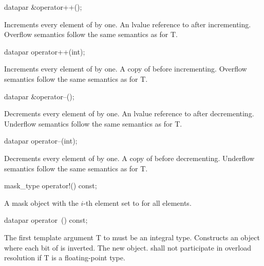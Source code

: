 \begin{wgText}
  \begin{itemdecl}
datapar &operator++();
  \end{itemdecl}
  \begin{itemdescr}
    \pnum\effects Increments every element of  by one.
    \pnum\returns An lvalue reference to  after incrementing.
    \pnum\remarks Overflow semantics follow the same semantics as for \type T.
  \end{itemdescr}

  \begin{itemdecl}
datapar operator++(int);
  \end{itemdecl}
  \begin{itemdescr}
    \pnum\effects Increments every element of  by one.
    \pnum\returns A copy of  before incrementing.
    \pnum\remarks Overflow semantics follow the same semantics as for \type T.
  \end{itemdescr}

  \begin{itemdecl}
datapar &operator--();
  \end{itemdecl}
  \begin{itemdescr}
    \pnum\effects Decrements every element of  by one.
    \pnum\returns An lvalue reference to  after decrementing.
    \pnum\remarks Underflow semantics follow the same semantics as for \type T.
  \end{itemdescr}

  \begin{itemdecl}
datapar operator--(int);
  \end{itemdecl}
  \begin{itemdescr}
    \pnum\effects Decrements every element of  by one.
    \pnum\returns A copy of  before decrementing.
    \pnum\remarks Underflow semantics follow the same semantics as for \type T.
  \end{itemdescr}

  \begin{itemdecl}
mask_type operator!() const;
  \end{itemdecl}
  \begin{itemdescr}
    \pnum\returns A mask object with the $i$-th element set to  for all elements.
  \end{itemdescr}

  \begin{itemdecl}
datapar operator~() const;
  \end{itemdecl}
  \begin{itemdescr}
    \pnum\requires The first template argument \type T to \datapar must be an integral type.
    \pnum\effects Constructs an object where each bit of  is inverted.
    \pnum\returns The new object.
    \pnum\remarks \datapar{} shall not participate in overload resolution if \type T is a floating-point type.
  \end{itemdescr}


\end{wgText}

